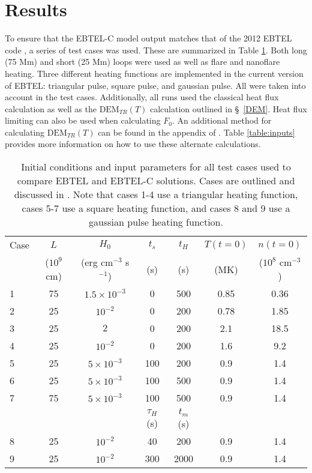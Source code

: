 \documentclass[preprint,10pt]{aastex}
\begin{document}
\section{Results}
To ensure that the EBTEL-C model output matches that of the 2012 EBTEL code \cite[see][]{cargill_enthalpy-based_2012}, a series of test cases was used. These are summarized in Table \ref{table:cases}. Both long (75 Mm) and short (25 Mm) loops were used as well as flare and nanoflare heating. Three different heating functions are implemented in the current version of EBTEL: triangular pulse, square pulse, and gaussian pulse. All were taken into account in the test cases. Additionally, all runs used the classical heat flux calculation as well as the $\text{DEM}_{TR}(T)$ calculation outlined in \S~\ref{DEM}. Heat flux limiting can also be used when calculating $F_0$. An additional method for calculating $\text{DEM}_{TR}(T)$ can be found in the appendix of \citet{klimchuk_highly_2008}. Table \ref{table:inputs} provides more information on how to use these alternate calculations.
%
\begin{table}[ht]
\begin{center}
\begin{tabular}{l c c c c c c}
\hline
\hline
Case		&	$L$			&	$H_0$				& $t_s$		&	$t_H$  	&	$T(t=0)$ 	&	$n(t=0)$ \\
		&	($10^9$ cm)	&	(erg cm$^{-3}$ s$^{-1}$)	& (s)			&	(s)		&	(MK)		&	($10^8$ cm$^{-3}$) \\ \hline
1		&	75			&	$1.5\times10^{-3}$		& 0			&	500		&	0.85		&	0.36	\\
2		&	25			&	$10^{-2}$				& 0			&	200		&	0.78		&	1.85	\\
3		&	25			&	$2$					& 0			&	200		&	2.1		&	18.5	\\
4		&	25			&	$10^{-2}$				& 0			&	200		&	1.6		&	 9.2	\\
5		&	25			&	$5\times10^{-3}$		& 100		&	200		&	0.9		&	1.4	\\
6		&	25			&	$5\times10^{-3}$		& 100		&	500		&	0.9		&	1.4	\\
7		&	75			&	$5\times10^{-3}$		& 100		&	500		&	0.9		&	1.4	\\ \hline
		&				&						& $\tau_H$ (s)	& $t_m$ (s)	&			&		\\ \hline
8		&	25			&	$10^{-2}$				& 40			&	200		&	0.9		&	1.4	\\
9		&	25			&	$10^{-2}$				& 300		&	2000		&	0.9		&	1.4	\\ \hline
\end{tabular}
\caption{Initial conditions and input parameters for all test cases used to compare EBTEL and EBTEL-C solutions. Cases are outlined and discussed in \citet{cargill_enthalpy-based_2012,cargill_enthalpy-based_2012-1}. Note that cases 1-4 use a triangular heating function, cases 5-7 use a square heating function, and cases 8 and 9 use a gaussian pulse heating function.}
\label{table:cases}
\end{center}
\end{table}%
\end{document}
